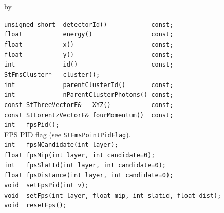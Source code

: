 \documentclass[twoside]{article}
\newcommand{\entrylabel}[1]{\mbox{\textbf{{#1}}}\hfil}%
\newenvironment{entry}
{\begin{list}{}%
    {\renewcommand{\makelabel}{\entrylabel}%
     \setlength{\labelwidth}{90pt}%
     \setlength{\leftmargin}{\labelwidth}
     \advance\leftmargin by \labelsep%
      }%
    }%
  {\end{list}}
\newcommand{\Entrylabel}[1]%
{\raisebox{0pt}[1ex][0pt]{\makebox[\labelwidth][l]%
    {\parbox[t]{\labelwidth}{\hspace{0pt}\textbf{{#1}}}}}}
\newenvironment{Entry}%
{\renewcommand{\entrylabel}{\Entrylabel}\begin{entry}}%
  {\end{entry}}
\begin{document}
\begin{Entry}
\item[Public Member\\ Functions]
    \verb+unsigned short  detectorId()            const;+\\
    \verb+float           energy()                const;+\\
    \verb+float           x()                     const;+\\
    \verb+float           y()                     const;+\\
    \verb+int             id()                    const;+\\
    \verb+StFmsCluster*   cluster();+\\
    \verb+int             parentClusterId()       const;+\\
    \verb+int             nParentClusterPhotons() const;+\\
    \verb+const StThreeVectorF&   XYZ()           const;+\\
    \verb+const StLorentzVectorF& fourMomentum()  const;+\\
    \verb+int   fpsPid();+\\
        FPS PID flag (see \texttt{StFmsPointPidFlag}).\\
    \verb+int   fpsNCandidate(int layer);+\\
    \verb+float fpsMip(int layer, int candidate=0);+\\
    \verb+int   fpsSlatId(int layer, int candidate=0);+\\
    \verb+float fpsDistance(int layer, int candidate=0);+\\
    \verb+void  setFpsPid(int v);+\\
    \verb+void  setFps(int layer, float mip, int slatid, float dist);+\\
    \verb+void  resetFps();+\\
\end{Entry}
\clearpage

\end{document}
